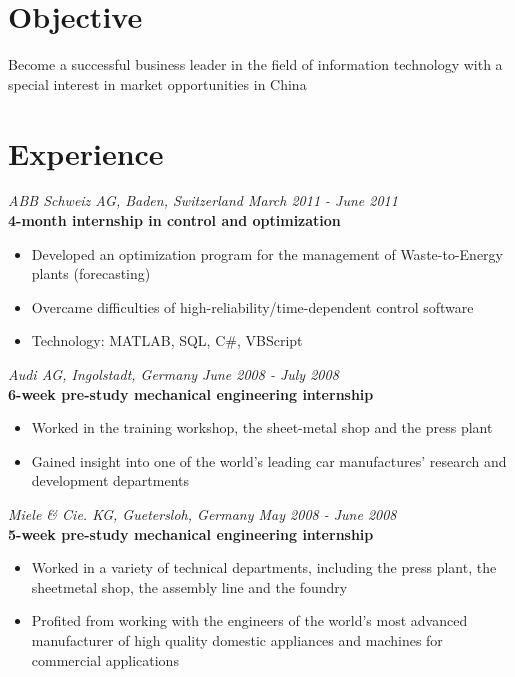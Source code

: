 \documentclass[margin]{res}
\begin{document}
 
 
 
\begin{resume} 
 
\section{Objective} 
Become a successful business leader in the field of information technology with a special 
interest in market opportunities in China 
 
\section{Experience}
  {\it ABB Schweiz AG, Baden, Switzerland \hfill March 2011 - June 2011} \\
  {\bf 4-month internship in control and optimization}
  \begin{itemize} \itemsep -0.5pt 
  \item Developed an optimization program for the management of Waste-to-Energy plants (forecasting)
  \item Overcame difficulties of high-reliability/time-dependent control software
  \item Technology: MATLAB, SQL, C\#, VBScript
  \end{itemize}
  {\it Audi AG, Ingolstadt, Germany \hfill June 2008 - July 2008} \\
  {\bf 6-week pre-study mechanical engineering internship}
  \begin{itemize} \itemsep -0.5pt 
  \item Worked in the training workshop, the sheet-metal shop and the press plant
  \item Gained insight into one of the world’s leading car manufactures’ research and development departments
  \end{itemize}
  {\it Miele \& Cie. KG, Guetersloh, Germany \hfill May 2008 - June 2008} \\
  {\bf 5-week pre-study mechanical engineering internship}
  \begin{itemize} \itemsep -0.5pt
  \item Worked in a variety of technical departments, including the press plant, the sheetmetal shop, the assembly line and the foundry
  \item Profited from working with the engineers of the world’s most advanced manufacturer of high quality domestic appliances and machines for commercial applications

\end{itemize}
\end{resume}
\end{document}

